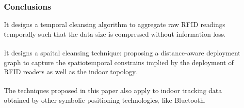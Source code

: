 
\begin{frame}
\frametitle{Conclusions}



It designs a temporal cleansing algorithm to aggregate raw RFID readings temporally such that the data size is compressed without information loss.\\~\\

It designs a spaital cleansing technique: proposing a distance-aware deployment graph to capture the spatiotemporal constrains implied by the deployment of RFID readers as well as the indoor topology.\\~\\

The techniques proposed in this paper also apply to indoor tracking data obtained by other symbolic positioning technologies, like Bluetooth.


\end{frame}
